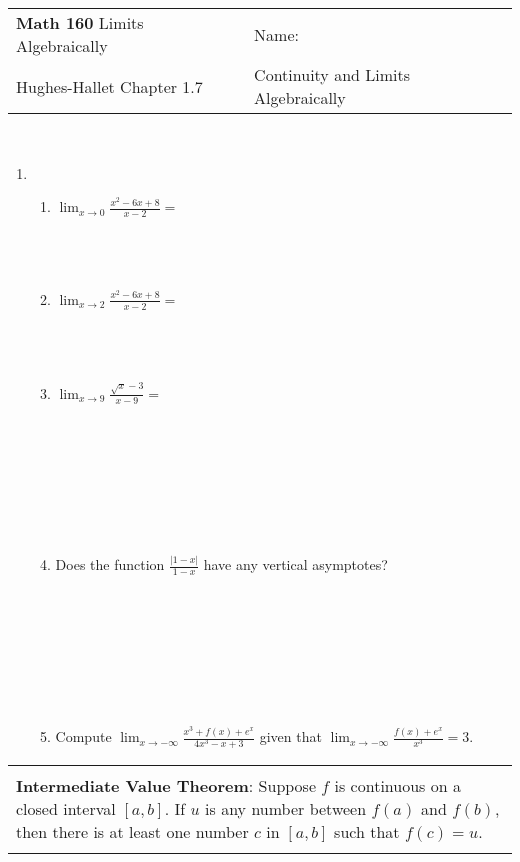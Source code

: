 \documentclass[12pt]{report}
\newenvironment{boxe}
    {\begin{center}
    \begin{tabular}{|p{0.9\textwidth}|}
    \hline\\
    }
    { 
    \\\\\hline
    \end{tabular} 
    \end{center}
    }
\begin{document}
\begin{tabular*}{\textwidth}{@{\extracolsep{\fill}}ll}
\textbf{Math 160} Limits Algebraically & \;\;Name: \hrulefill \\
 Hughes-Hallet Chapter 1.7& Continuity and Limits Algebraically\hspace{1in}  \\
\hline\hline
\end{tabular*} \\


\begin{enumerate}
\item
\begin{enumerate}[label=\alph*.]
    \item $\displaystyle{\lim_{x\to 0} \frac{x^{2}-6x+8}{x-2}}=$\\\\\\\\
    \item $\displaystyle{\lim_{x\to 2} \frac{x^{2}-6x+8}{x-2}}=$\\\\\\\\
    \item $\displaystyle{\lim_{x\to 9} \frac{\sqrt{x}-3}{x-9}=}$\\\\\\\\\\\\\\\\
    \item Does the function $\displaystyle{\frac{|1-x|}{1-x}}$ have any vertical asymptotes?\\\\\\\\\\\\\\\\
    \item Compute $\displaystyle{\lim_{x\rightarrow-\infty}\frac{x^3+f(x)+e^x}{4x^3-x+3}}$ given that $\displaystyle{\lim_{x\rightarrow-\infty}\frac{f(x)+e^x}{x^3}=3}$.
    
\end{enumerate}
\end{enumerate} 
\newpage
\begin{boxe}
\textbf{Intermediate Value Theorem}: Suppose $f$ is continuous on a closed interval $[a,b]$. If $u$ is any number between $f(a)$ and $f(b)$, then there is at least one number $c$ in $[a,b]$ such that $f(c)=u$.
\end{boxe}
\end{document}
